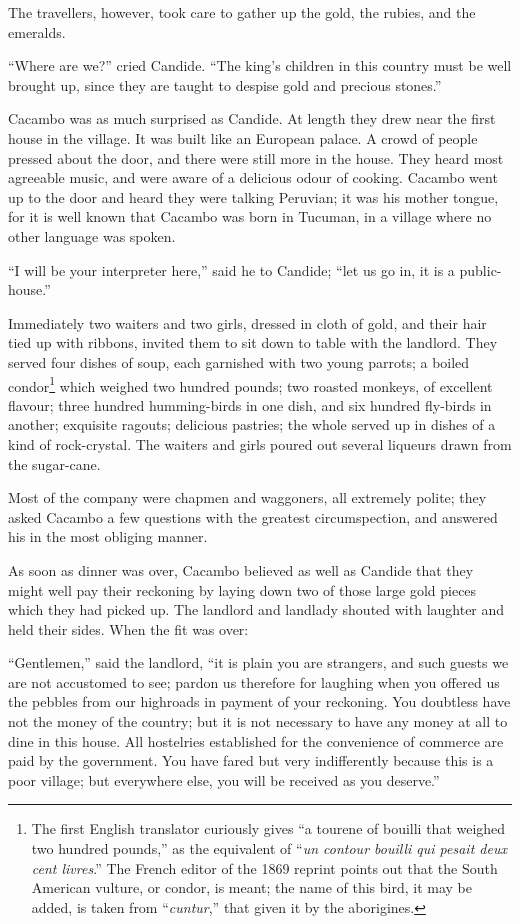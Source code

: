The travellers, however, took care to gather up the gold, the rubies, and the emeralds.

``Where are we?'' cried Candide. ``The king's children in this country must be well brought up, since they are taught to despise gold and precious stones.''

Cacambo was as much surprised as Candide. At length they drew near the first house in the village. It was built like an European palace. A crowd of people pressed about the door, and there were still more in the house. They heard most agreeable music, and were aware of a delicious odour of cooking. Cacambo went up to the door and heard they were talking Peruvian; it was his mother tongue, for it is well known that Cacambo was born in Tucuman, in a village where no other language was spoken.

``I will be your interpreter here,'' said he to Candide; ``let us go in, it is a public-house.''

Immediately two waiters and two girls, dressed in cloth of gold, and their hair tied up with ribbons, invited them to sit down to table with the landlord. They served four dishes of soup, each garnished with two young parrots; a boiled condor\footnote{The first English translator curiously gives ``a tourene of bouilli that weighed two hundred pounds,'' as the equivalent of ``\textit{un contour bouilli qui pesait deux cent livres}.'' The French editor of the 1869 reprint points out that the South American vulture, or condor, is meant; the name of this bird, it may be added, is taken from ``\textit{cuntur},'' that given it by the aborigines.} which weighed two hundred pounds; two roasted monkeys, of excellent flavour; three hundred humming-birds in one dish, and six hundred fly-birds in another; exquisite ragouts; delicious pastries; the whole served up in dishes of a kind of rock-crystal. The waiters and girls poured out several liqueurs drawn from the sugar-cane.

Most of the company were chapmen and waggoners, all extremely polite; they asked Cacambo a few questions with the greatest circumspection, and answered his in the most obliging manner.

As soon as dinner was over, Cacambo believed as well as Candide that they might well pay their reckoning by laying down two of those large gold pieces which they had picked up. The landlord and landlady shouted with laughter and held their sides. When the fit was over:

``Gentlemen,'' said the landlord, ``it is plain you are strangers, and such guests we are not accustomed to see; pardon us therefore for laughing when you offered us the pebbles from our highroads in payment of your reckoning. You doubtless have not the money of the country; but it is not necessary to have any money at all to dine in this house. All hostelries established for the convenience of commerce are paid by the government. You have fared but very indifferently because this is a poor village; but everywhere else, you will be received as you deserve.''


